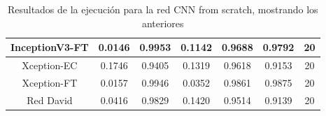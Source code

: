 \documentclass[11pt,a4paper]{article}
\theoremstyle{definition}
\begin{document}
\begin{table}[H]
\begin{tabular}{|c|c|c|c|c|c|c|}
\hline
InceptionV3-FT                                      & \textcolor[rgb]{0.129,0.129,0.129}{0.0146 } & \textcolor[rgb]{0.129,0.129,0.129}{0.9953 } & \textcolor[rgb]{0.129,0.129,0.129}{0.1142 }                                                                       & \textcolor[rgb]{0.129,0.129,0.129}{0.9688}                                                                             & \textcolor[rgb]{0.129,0.129,0.129}{0.9792}                                                                       & 20                                                                                                              \\
\hline
Xception-EC                                            & \textcolor[rgb]{0.129,0.129,0.129}{0.1746 } & \textcolor[rgb]{0.129,0.129,0.129}{0.9405 } & \textcolor[rgb]{0.129,0.129,0.129}{0.1319 }                                                                       & \textcolor[rgb]{0.129,0.129,0.129}{0.9618}                                                                             & \textcolor[rgb]{0.129,0.129,0.129}{0.9153}                                                                       & 20                                                                                                              \\
\hline
Xception-FT                        & \textcolor[rgb]{0.129,0.129,0.129}{0.0157 } & \textcolor[rgb]{0.129,0.129,0.129}{0.9946 } & \textcolor[rgb]{0.129,0.129,0.129}{0.0352 }                                                                       & \textcolor[rgb]{0.129,0.129,0.129}{0.9861}                                                                             & \textcolor[rgb]{0.129,0.129,0.129}{0.9875}                                                                       & 20                                                                                                              \\
\hline
\rowcolor{green} Red David                        & \textcolor[rgb]{0.129,0.129,0.129}{0.0416 } & \textcolor[rgb]{0.129,0.129,0.129}{0.9829 } & \textcolor[rgb]{0.129,0.129,0.129}{0.1420 }                                                                       & \textcolor[rgb]{0.129,0.129,0.129}{0.9514 }                                                                             & \textcolor[rgb]{0.129,0.129,0.129}{0.9139}                                                                       & 20                                                                                                              \\
\hline
\end{tabular}
\caption{Resultados de la ejecución para la red CNN from scratch, mostrando los anteriores}

\end{table}
\end{document}
